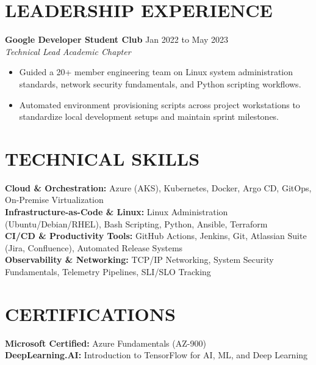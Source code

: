 \documentclass[11pt,letterpaper]{article}
\begin{document}
\section*{LEADERSHIP EXPERIENCE}
\noindent\small \textbf{Google Developer Student Club} \hfill Jan 2022 to May 2023 \\
\textit{Technical Lead} \hfill \textit{Academic Chapter}
\begin{itemize}
\item Guided a 20+ member engineering team on Linux system administration standards, network security fundamentals, and Python scripting workflows.
\item Automated environment provisioning scripts across project workstations to standardize local development setups and maintain sprint milestones.
\end{itemize}
\section*{TECHNICAL SKILLS}
\noindent\small \textbf{Cloud \& Orchestration:} Azure (AKS), Kubernetes, Docker, Argo CD, GitOps, On-Premise Virtualization \\
\textbf{Infrastructure-as-Code \& Linux:} Linux Administration (Ubuntu/Debian/RHEL), Bash Scripting, Python, Ansible, Terraform \\
\textbf{CI/CD \& Productivity Tools:} GitHub Actions, Jenkins, Git, Atlassian Suite (Jira, Confluence), Automated Release Systems \\
\textbf{Observability \& Networking:} TCP/IP Networking, System Security Fundamentals, Telemetry Pipelines, SLI/SLO Tracking
\section*{CERTIFICATIONS}
\noindent\small \textbf{Microsoft Certified:} Azure Fundamentals (AZ-900) \\
\textbf{DeepLearning.AI:} Introduction to TensorFlow for AI, ML, and Deep Learning
\end{document}
